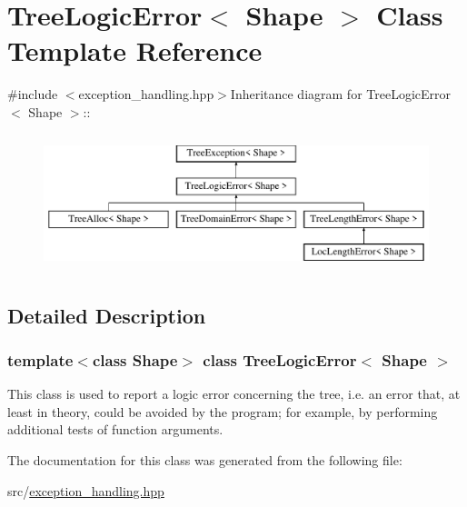 \hypertarget{classTreeLogicError}{
\section{TreeLogicError$<$ Shape $>$ Class Template Reference}
\label{classTreeLogicError}
}


{\ttfamily \#include $<$exception\_\-handling.hpp$>$}Inheritance diagram for TreeLogicError$<$ Shape $>$::\begin{figure}[H]
\begin{center}
\leavevmode
\includegraphics[height=4cm]{classTreeLogicError}
\end{center}
\end{figure}


\subsection{Detailed Description}
\subsubsection*{template$<$class Shape$>$ class TreeLogicError$<$ Shape $>$}

This class is used to report a logic error concerning the tree, i.e. an error that, at least in theory, could be avoided by the program; for example, by performing additional tests of function arguments. 

The documentation for this class was generated from the following file:\begin{DoxyCompactItemize}
\item 
src/\hyperlink{exception__handling_8hpp}{exception\_\-handling.hpp}\end{DoxyCompactItemize}
